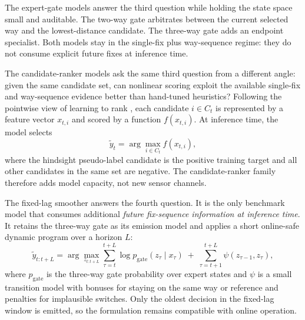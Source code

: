 \documentclass{article}
\begin{document}
The expert-gate models answer the third question while holding the state space small and auditable. The two-way gate arbitrates between the current selected way and the lowest-distance candidate. The three-way gate adds an endpoint specialist. Both models stay in the single-fix plus way-sequence regime: they do not consume explicit future fixes at inference time.

The candidate-ranker models ask the same third question from a different angle: given the same candidate set, can nonlinear scoring exploit the available single-fix and way-sequence evidence better than hand-tuned heuristics? Following the pointwise view of learning to rank \cite{liu2009ltr}, each candidate \(i \in C_t\) is represented by a feature vector \(x_{t,i}\) and scored by a function \(f(x_{t,i})\). At inference time, the model selects
\[
\tilde{y}_t = \arg\max_{i \in C_t} f(x_{t,i}),
\]
where the hindsight pseudo-label candidate is the positive training target and all other candidates in the same set are negative. The candidate-ranker family therefore adds model capacity, not new sensor channels.

The fixed-lag smoother answers the fourth question. It is the only benchmark model that consumes additional \emph{future fix-sequence information at inference time}. It retains the three-way gate as its emission model and applies a short online-safe dynamic program over a horizon \(L\):
\[
\tilde{y}_{t:t+L}
=
\arg\max_{z_{t:t+L}}
\sum_{\tau=t}^{t+L} \log p_{\mathrm{gate}}(z_\tau \mid x_\tau)
\;+\;
\sum_{\tau=t+1}^{t+L} \psi(z_{\tau-1}, z_\tau),
\]
where \(p_{\mathrm{gate}}\) is the three-way gate probability over expert states and \(\psi\) is a small transition model with bonuses for staying on the same way or reference and penalties for implausible switches. Only the oldest decision in the fixed-lag window is emitted, so the formulation remains compatible with online operation.
\end{document}
